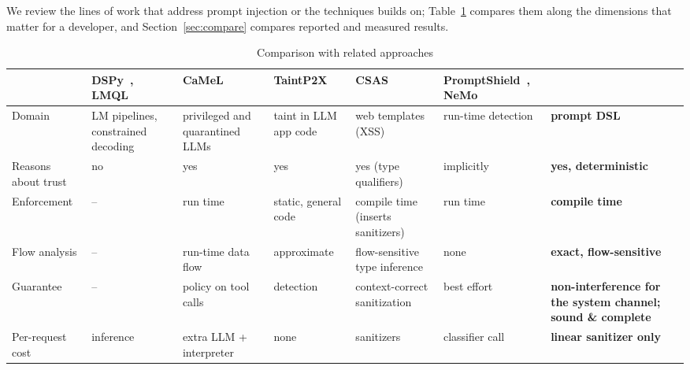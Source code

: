\documentclass[journal]{IEEEtran}
\begin{document}
We review the lines of work that address prompt injection or the techniques \TL{} builds on; Table~\ref{tab:related} compares them along the dimensions that matter for a developer, and Section~\ref{sec:compare} compares reported and measured results.

\begin{table}[t]
\caption{Comparison with related approaches}
\label{tab:related}
\centering\footnotesize
\setlength{\tabcolsep}{3pt}
\begin{tabular}{@{}p{2.0cm}p{2.2cm}p{2.2cm}p{2.2cm}p{2.2cm}p{2.4cm}p{2.4cm}@{}}
\toprule
 & DSPy~\cite{khattab2024dspy}, LMQL~\cite{beurer2023lmql} & CaMeL~\cite{debenedetti2025camel} & TaintP2X~\cite{he2026taintp2x} & CSAS~\cite{samuel2011csas} & PromptShield~\cite{jacob2024promptshield}, NeMo~\cite{rebedea2023nemo} & \textbf{\TL{}} \\
\midrule
Domain & LM pipelines, constrained decoding & privileged and quarantined LLMs & taint in LLM app code & web templates (XSS) & run-time detection & \textbf{prompt DSL} \\
Reasons about trust & no & yes & yes & yes (type qualifiers) & implicitly & \textbf{yes, deterministic} \\
Enforcement & -- & run time & static, general code & compile time (inserts sanitizers) & run time & \textbf{compile time} \\
Flow analysis & -- & run-time data flow & approximate & flow-sensitive type inference & none & \textbf{exact, flow-sensitive} \\
Guarantee & -- & policy on tool calls & detection & context-correct sanitization & best effort & \textbf{non-interference for the system channel; sound \& complete} \\
Per-request cost & inference & extra LLM + interpreter & none & sanitizers & classifier call & \textbf{linear sanitizer only} \\
\bottomrule
\end{tabular}
\end{table}
\end{document}
